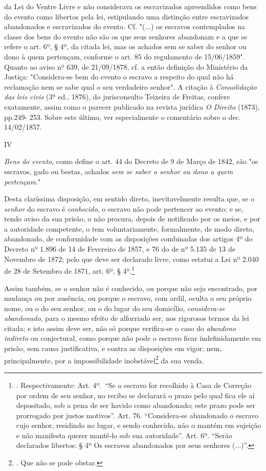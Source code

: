 {  da Lei do Ventre Livre e não considerava os escravizados apreendidos
  como bens do evento como libertos pela lei, estipulando uma distinção
  entre escravizados abandonados e escravizados do evento. Cf. "(...) os
  escravos contemplados na classe dos bens do evento não são os que seus
  senhores abandonam e a que se refere o art. 6º, § 4º, da citada lei,
  mas os achados sem se saber do senhor ou dono à quem pertençam,
  conforme o art. 85 do regulamento de 15/06/1859". Quanto ao aviso nº
  639, de 21/09/1878, cf. a então definição do Ministério da Justiça:
  "Considera-se bem do evento o escravo a respeito do qual não há
  reclamação nem se sabe qual o seu verdadeiro senhor". A citação à
  \emph{Consolidação das leis civis} (3ª ed., 1876), do jurisconsulto
  Teixeira de Freitas, confere exatamente, assim como o parecer
  publicado na revista jurídica \emph{O Direito} (1873), pp.249- 253.
  Sobre este último, ver especialmente o comentário sobre o dec.
  14/02/1857.}

IV

\emph{Bens do evento}, como define o art. 44 do Decreto de 9 de Março de
1842, são "os escravos, gado ou bestas, achados \emph{sem se saber o
senhor ou dono a quem pertençam}."

Desta claríssima disposição, em sentido direto, inevitavelmente resulta
que, se o \emph{senhor} do escravo é \emph{conhecido}, o escravo não
pode pertencer ao evento; e se, tendo aviso da sua prisão, o não
procura, depois de notificado por os meios, e por a autoridade
competente, o tem voluntariamente, formalmente, de modo direto,
abandonado, de conformidade com as disposições combinadas dos artigos 4º
do Decreto nº 1.896 de 14 de Fevereiro de 1857, e 76 do de nº 5.135 de
13 de Novembro de 1872; pelo que deve ser declarado livre, como estatui
a Lei nº 2.040 de 28 de Setembro de 1871, art. 6º, § 4º.\footnote{.
  Respectivamente: Art. 4º.~``Se o escravo for recolhido à Casa de
  Correção por ordem de seu senhor, no recibo se declarará o prazo pelo
  qual fica ele aí depositado, sob a pena de ser havido como abandonado;
  este prazo pode ser prorrogado por justos motivos''. Art. 76.
  ``Considera-se abandonado o escravo cujo senhor, residindo no lugar, e
  sendo conhecido, não o mantém em sujeição e não manifesta querer
  mantê-lo sob sua autoridade''. Art. 6º. ``Serão declarados libertos: §
  4º Os escravos abandonados por seus senhores (...)''.}

Assim também, se o senhor não é conhecido, ou porque não seja
encontrado, por mudança ou por ausência, ou porque o escravo, com ardil,
oculta o seu próprio nome, ou o do seu senhor, ou o do lugar do seu
domicílio, \emph{considera-se abandonado}, para o mesmo efeito de
alforriado ser, nos rigorosos termos da lei citada; e isto assim deve
ser, não só porque verifica-se o caso do \emph{abandono indireto} ou
conjectural, como porque não pode o escravo ficar indefinidamente em
prisão, sem causa justificativa, e contra as disposições em vigor; nem,
principalmente, por a impossibilidade inobstável\footnote{. Que não se
  pode obstar.} da sua venda.

